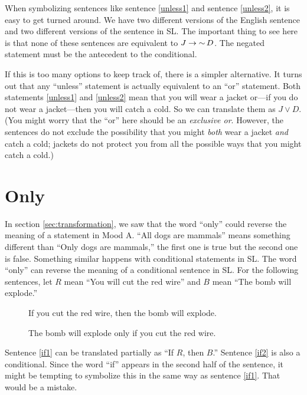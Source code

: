When symbolizing sentences like sentence \ref{unless1} and sentence \ref{unless2}, it is easy to get turned around. We have two different versions of the English sentence and two different versions of the sentence in SL. The important thing to see here is that none of these sentences are equivalent to $J \mathrel{\rightarrow} \mathop{\sim} D$. The negated statement must be the antecedent to the conditional.

If this is too many options to keep track of, there is a simpler alternative. It turns out that any ``unless'' statement is actually equivalent to an ``or'' statement. Both statements \ref{unless1} and  \ref{unless2} mean that you will wear a jacket or---if you do not wear a jacket---then you will catch a cold. So we can translate them as $J \lor D$. (You might worry that the ``or'' here should be an \emph{exclusive or}. However, the sentences do not exclude the possibility that you might \emph{both} wear a jacket \emph{and} catch a cold; jackets do not protect you from all the possible ways that you might catch a cold.)

\section{Only}

In section \ref{sec:transformation}, we saw that the word ``only'' could reverse the meaning of a statement in Mood A. ``All dogs are mammals'' means something different than ``Only dogs are mammals,'' the first one is true but the second one is false. Something similar happens with conditional statements in SL.
The word ``only'' can reverse the meaning of a conditional sentence in SL.
For the following sentences, let $R$ mean ``You will cut the red wire'' and $B$ mean ``The bomb will explode.''

\begin{description}
\item[\label{if1}] If you cut the red wire, then the bomb will explode.
\item[\label{if2}] The bomb will explode only if you cut the red wire.
\end{description}

Sentence \ref{if1} can be translated partially as ``If $R$, then $B$.'' Sentence \ref{if2} is also a conditional. Since the word ``if'' appears in the second half of the sentence, it might be tempting to symbolize this in the same way as sentence \ref{if1}. That would be a mistake.

